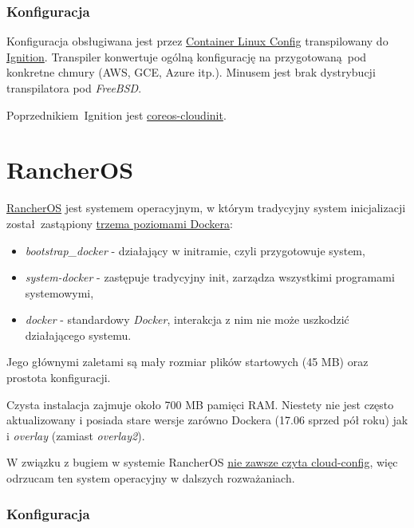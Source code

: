 \documentclass[a4paper,12pt,twoside,openany]{report}
\providecommand{\tightlist}{%
  \setlength{\itemsep}{0pt}\setlength{\parskip}{0pt}}
\begin{document}
\hypertarget{konfiguracja}{%
\subsubsection{Konfiguracja}\label{konfiguracja}}

Konfiguracja obsługiwana jest przez
\href{https://coreos.com/os/docs/latest/provisioning.html}{Container
Linux Config} transpilowany do
\href{https://coreos.com/ignition/docs/latest/}{Ignition}. Transpiler
konwertuje ogólną konfigurację na przygotowaną~pod konkretne chmury
(AWS, GCE, Azure itp.). Minusem jest brak dystrybucji transpilatora pod
\emph{FreeBSD}.

Poprzednikiem~Ignition jest
\protect\hyperlink{coreos-cloudinit}{coreos-cloudinit}.

\hypertarget{rancheros}{%
\section{RancherOS}\label{rancheros}}

\href{https://rancher.com/rancher-os/}{RancherOS} jest systemem
operacyjnym, w którym tradycyjny system inicjalizacji został~zastąpiony
\href{http://rancher.com/docs/os/latest/en/configuration/docker/}{trzema
poziomami Dockera}:

\begin{itemize}
\tightlist
\item
  \emph{bootstrap\_docker} - działający w initramie, czyli przygotowuje
  system,
\item
  \emph{system-docker} - zastępuje tradycyjny init, zarządza wszystkimi
  programami systemowymi,
\item
  \emph{docker} - standardowy \emph{Docker}, interakcja z nim nie może
  uszkodzić działającego systemu.
\end{itemize}

Jego głównymi zaletami są mały rozmiar plików startowych (45 MB) oraz
prostota konfiguracji.

Czysta instalacja zajmuje około 700 MB pamięci RAM. Niestety nie jest
często aktualizowany i posiada stare wersje zarówno Dockera (17.06
sprzed pół roku) jak i \emph{overlay} (zamiast \emph{overlay2}).

W związku z bugiem w systemie RancherOS
\href{https://github.com/rancher/os/issues/2204}{nie zawsze czyta
cloud-config}, więc odrzucam ten system operacyjny w dalszych
rozważaniach.

\hypertarget{ros-config}{%
\subsubsection{Konfiguracja}\label{ros-config}}
\end{document}
